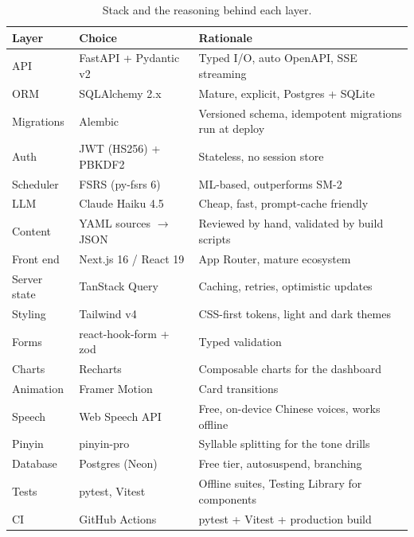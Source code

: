 \documentclass[11pt,a4paper]{article}
\begin{document}
\begin{table}[h]
\centering\small
\begin{tabularx}{\linewidth}{@{}llL@{}}
\toprule
\textbf{Layer} & \textbf{Choice} & \textbf{Rationale} \\
\midrule
API            & FastAPI + Pydantic v2   & Typed I/O, auto OpenAPI, SSE streaming \\
ORM            & SQLAlchemy 2.x          & Mature, explicit, Postgres + SQLite \\
Migrations     & Alembic                 & Versioned schema, idempotent migrations run at deploy \\
Auth           & JWT (HS256) + PBKDF2    & Stateless, no session store \\
Scheduler      & FSRS (py-fsrs 6)        & ML-based, outperforms SM-2 \\
LLM            & Claude Haiku 4.5        & Cheap, fast, prompt-cache friendly \\
Content        & YAML sources $\to$ JSON & Reviewed by hand, validated by build scripts \\
Front end      & Next.js 16 / React 19   & App Router, mature ecosystem \\
Server state   & TanStack Query          & Caching, retries, optimistic updates \\
Styling        & Tailwind v4             & CSS-first tokens, light and dark themes \\
Forms          & react-hook-form + zod   & Typed validation \\
Charts         & Recharts                & Composable charts for the dashboard \\
Animation      & Framer Motion           & Card transitions \\
Speech         & Web Speech API          & Free, on-device Chinese voices, works offline \\
Pinyin         & pinyin-pro              & Syllable splitting for the tone drills \\
Database       & Postgres (Neon)         & Free tier, autosuspend, branching \\
Tests          & pytest, Vitest          & Offline suites, Testing Library for components \\
CI             & GitHub Actions          & pytest + Vitest + production build \\
\bottomrule
\end{tabularx}
\caption{Stack and the reasoning behind each layer.}
\end{table}
\end{document}
